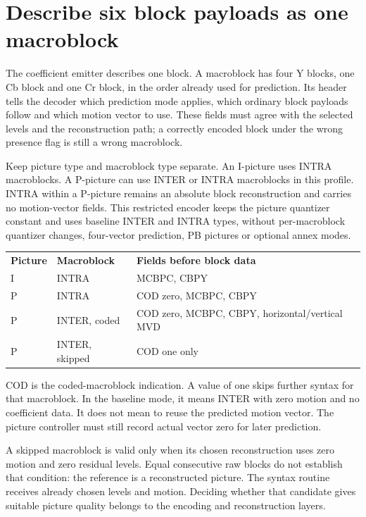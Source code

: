 \section{Describe six block payloads as one macroblock}
The coefficient emitter describes one block. A macroblock has four Y blocks,
one Cb block and one Cr block, in the order already used for prediction. Its
header tells the decoder which prediction mode applies, which ordinary block
payloads follow and which motion vector to use. These fields must agree with
the selected levels and the reconstruction path; a correctly encoded block under
the wrong presence flag is still a wrong macroblock.

Keep picture type and macroblock type separate. An I-picture uses INTRA
macroblocks. A P-picture can use INTER or INTRA macroblocks in this profile.
INTRA within a P-picture remains an absolute block reconstruction and carries
no motion-vector fields. This restricted encoder keeps the picture quantizer
constant and uses baseline INTER and INTRA types, without per-macroblock quantizer
changes, four-vector prediction, PB pictures or optional annex modes.

\begin{center}
  \begin{tabular}{lll}
    \textbf{Picture} & \textbf{Macroblock} & \textbf{Fields before block data}              \\
    I                & INTRA               & MCBPC, CBPY                                    \\
    P                & INTRA               & COD zero, MCBPC, CBPY                          \\
    P                & INTER, coded        & COD zero, MCBPC, CBPY, horizontal/vertical MVD \\
    P                & INTER, skipped      & COD one only
  \end{tabular}
\end{center}
COD is the coded-macroblock indication. A value of one skips further syntax for
that macroblock. In the baseline mode, it means INTER with zero motion and no
coefficient data. It does not mean to reuse the predicted motion vector. The
picture controller must still record actual vector zero for later prediction.

A skipped macroblock is valid only when its chosen reconstruction uses zero
motion and zero residual levels. Equal consecutive raw blocks do not establish
that condition: the reference is a reconstructed picture. The syntax routine
receives already chosen levels and motion. Deciding whether that candidate gives
suitable picture quality belongs to the encoding and reconstruction layers.

